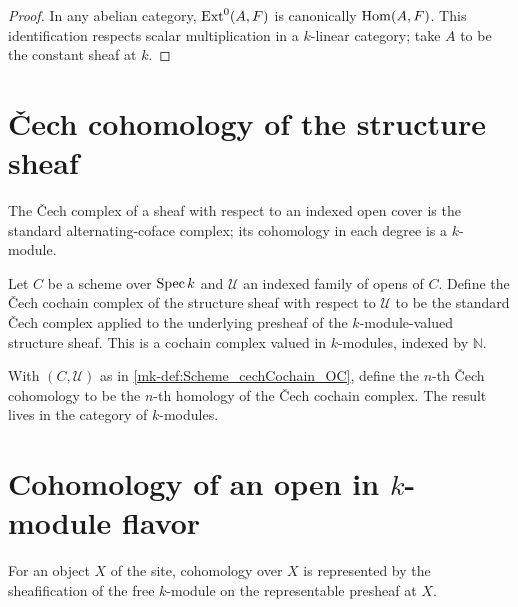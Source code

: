 \begin{proof}
  \leanok

  In any abelian category, \(\operatorname{Ext}^0(A,F)\) is canonically \(\operatorname{Hom}(A,F)\). This identification respects scalar multiplication in a \(k\)-linear category; take \(A\) to be the constant sheaf at \(k\).
\end{proof}

\section{\v{C}ech cohomology of the structure sheaf}
\label{mk-sec:moduleK_cech}

The \v{C}ech complex of a sheaf with respect to an indexed open cover is the standard alternating-coface complex; its cohomology in each degree is a \(k\)-module.

\begin{definition}\label{mk-def:Scheme_cechCochain_OC}
  \leanok

  Let \(C\) be a scheme over \(\operatorname{Spec} k\) and \(\mathcal U\) an indexed family of opens of \(C\). Define the \v{C}ech cochain complex of the structure sheaf with respect to \(\mathcal U\) to be the standard \v{C}ech complex applied to the underlying presheaf of the \(k\)-module-valued structure sheaf. This is a cochain complex valued in \(k\)-modules, indexed by \(\mathbb N\).
\end{definition}

\begin{definition}\label{mk-def:Scheme_cechCohomology_OC}
  \leanok

  With \((C, \mathcal U)\) as in \ref{mk-def:Scheme_cechCochain_OC}, define the \(n\)-th \v{C}ech cohomology to be the \(n\)-th homology of the \v{C}ech cochain complex. The result lives in the category of \(k\)-modules.
\end{definition}

\section{Cohomology of an open in \(k\)-module flavor}
\label{mk-sec:hmodule_prime}

For an object \(X\) of the site, cohomology over \(X\) is represented by the sheafification of the free \(k\)-module on the representable presheaf at \(X\).

